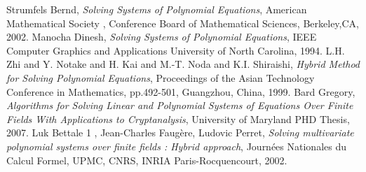 \documentclass[11pt]{article}
\begin{document}
\begin{thebibliography}{1}
  Strumfels Bernd,
  \textit{Solving Systems of Polynomial Equations},
   American Mathematical Society , Conference Board of Mathematical Sciences,
   Berkeley,CA,
   2002.
  Manocha Dinesh,
  \textit{Solving Systems of Polynomial Equations},
   IEEE Computer Graphics and Applications
   University of North Carolina,
   1994.
  L.H. Zhi and Y. Notake and H. Kai and M.-T. Noda and K.I. Shiraishi,
  \textit{Hybrid Method for Solving Polynomial Equations},
   Proceedings of the Asian Technology Conference in Mathematics, pp.492-501, Guangzhou, China, 1999. 
  Bard Gregory,
  \textit{Algorithms for Solving Linear and Polynomial Systems of Equations Over Finite Fields With Applications to Cryptanalysis},
   University of Maryland PHD Thesis,
   2007.
  Luk Bettale 1 , Jean-Charles Faugère, Ludovic Perret,
  \textit{Solving multivariate polynomial systems over finite fields : Hybrid approach},
   Journées Nationales du Calcul Formel,
   UPMC, CNRS, INRIA Paris-Rocquencourt,
   2002.
   

\end{thebibliography}
\end{document}
